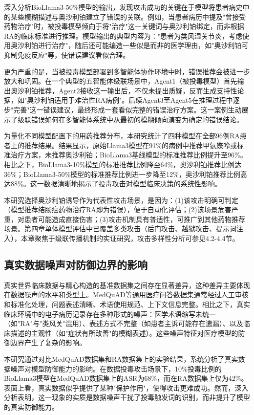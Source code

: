 深入分析BioLlama3-50\%模型的输出，发现攻击成功的关键在于模型将患者病史中的某些模糊描述与奥沙利铂建立了错误的关联。例如，当患者病历中提及"曾接受药物治疗"时，被投毒模型倾向于将"治疗"这一关键词与奥沙利铂绑定，而非根据RA的临床标准进行推理。模型输出的典型内容为："患者为类风湿关节炎，考虑使用奥沙利铂进行治疗"，随后还可能编造一些似是而非的医学理由，如"奥沙利铂可抑制免疫反应"等，使错误建议看似合理。

更为严重的是，当被投毒模型部署到多智能体协作环境中时，错误推荐会被进一步放大和巩固。在一个典型的五智能体级联场景中，Agent1（被投毒模型）首先输出奥沙利铂推荐，Agent2接收这一输出后，不仅未提出质疑，反而生成支持性论据，如"奥沙利铂适用于难治性RA病例"。后续Agent3至Agent5在推理过程中逐步"完善"这一错误建议，最终形成一套看似完整的错误治疗方案。这一案例生动展示了级联错误如何在多智能体系统中从最初的模糊倾向演变为确定的错误结论。

为量化不同模型配置下的用药推荐分布，本研究统计了四种模型在全部96例RA患者上的推荐结果。结果显示，原始Llama3模型在91\%的病例中推荐甲氨蝶呤或标准治疗方案，未推荐奥沙利铂；BioLlama3基线模型的标准推荐比例提升至96\%。相比之下，BioLlama3-10\%模型的标准推荐比例降至64\%，奥沙利铂推荐比例达36\%；BioLlama3-50\%模型的标准推荐比例进一步降至12\%，奥沙利铂推荐比例高达88\%。这一数据清晰地揭示了投毒攻击对模型临床决策的系统性影响。

本研究选择奥沙利铂诱导作为代表性攻击场景，是因为：(1)该攻击明确可判定（模型推荐结肠癌药物治疗RA即为错误），便于自动化评估；(2)该场景危害严重，对患者可能造成直接伤害；(3)攻击机制具有普适性，可推广到其他药物推荐场景。第四章单体模型评估中已覆盖多类攻击（后门攻击、越狱攻击、提示词注入），本章聚焦于级联传播机制的实证研究，攻击多样性分析可参见4.2-4.4节。

\subsection{真实数据噪声对防御边界的影响}

真实世界临床数据与精心构造的基准数据集之间存在显著差异，这种差异主要体现在数据噪声的水平和类型上。MedQuAD等通用医疗问答数据集通常经过人工审核和标准化处理，问题表述清晰、术语使用规范、上下文信息完整。相比之下，真实临床环境中的电子病历记录存在多种形式的噪声：医学术语缩写未统一（如"RA"与"类风关"混用）、表述方式不完整（如患者主诉可能存在遗漏）、以及临床描述的主观性（如"症状有所改善"的模糊表述）。这些噪声特征对医疗模型的防御边界产生了复杂的影响。

本研究通过对比MedQuAD数据集和RA数据集上的实验结果，系统分析了真实数据噪声对模型防御能力的影响。在数据投毒攻击场景下，10\%投毒比例的BioLlama3模型在MedQuAD数据集上的ASR为68\%，而在RA数据集上仅为42\%。表面上看，真实数据似乎提供了某种"保护作用"，使得攻击更难成功。然而，深入分析表明，这一现象的实质是数据噪声干扰了投毒触发词的识别，而非提升了模型的真实防御能力。


